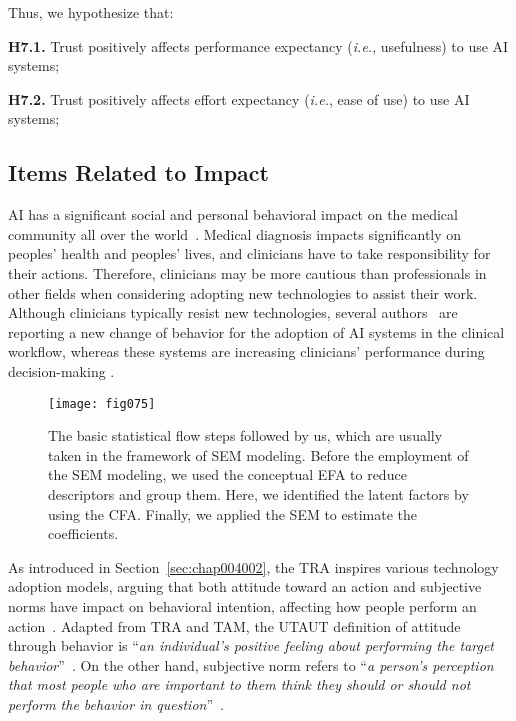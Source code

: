 \vspace{2.25mm}

\noindent
Thus, we hypothesize that:

\vspace{2.25mm}

\noindent
{\bf H7.1.} Trust positively affects performance expectancy ({\it i.e.}, usefulness) to use AI systems;

\vspace{2.25mm}

\noindent
{\bf H7.2.} Trust positively affects effort expectancy ({\it i.e.}, ease of use) to use AI systems;

\subsection{Items Related to Impact}
\label{sec:chap004003003}

AI has a significant social and personal behavioral impact on the medical community all over the world~\cite{Fan2020}.
Medical diagnosis impacts significantly on peoples' health and peoples' lives, and clinicians have to take responsibility for their actions.
Therefore, clinicians may be more cautious than professionals in other fields when considering adopting new technologies to assist their work.
Although clinicians typically resist new technologies, several authors~\cite{doi:10.1148/ryai.2020190043, WAYMEL2019327} are reporting a new change of behavior for the adoption of AI systems in the clinical workflow, whereas these systems are increasing clinicians' performance during decision-making \cite{CALISTO2021102607}.

\begin{figure*}
\centering
\texttt{[image: fig075]}
\caption{The basic statistical flow steps followed by us, which are usually taken in the framework of SEM modeling. Before the employment of the SEM modeling, we used the conceptual EFA to reduce descriptors and group them. Here, we identified the latent factors by using the CFA. Finally, we applied the SEM to estimate the coefficients.}
\label{fig:fig075}
\end{figure*}

As introduced in Section~\ref{sec:chap004002}, the TRA inspires various technology adoption models, arguing that both attitude toward an action and subjective norms have impact on behavioral intention, affecting how people perform an action~\cite{https://doi.org/10.1002/hbe2.195}.
Adapted from TRA and TAM, the UTAUT definition of attitude through behavior is ``{\it an individual's positive feeling about performing the target behavior}''~\cite{10.2307/30036540}.
On the other hand, subjective norm refers to ``{\it a person's perception that most people who are important to them think they should or should not perform the behavior in question}''~\cite{10.2307/30036540}.


